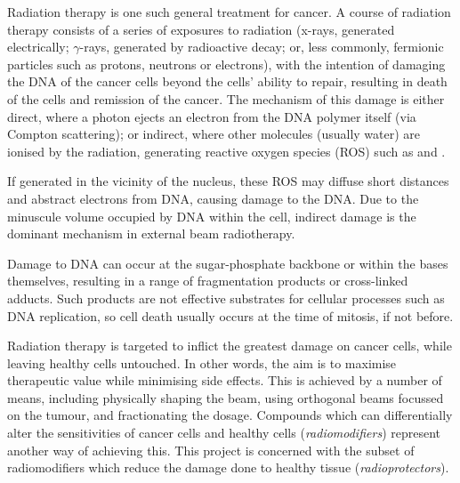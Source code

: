 \begin{refsection}
Radiation therapy is one such general treatment for cancer.
A course of radiation therapy consists of a series of exposures to radiation (x-rays, generated electrically; $\gamma$-rays, generated by radioactive decay; or, less commonly, fermionic particles such as protons, neutrons or electrons), with the intention of damaging the DNA of the cancer cells beyond the cells' ability to repair, resulting in death of the cells and remission of the cancer\autocite{Ward1994}.
The mechanism of this damage is either direct, where a photon ejects an electron from the DNA polymer itself (via Compton scattering); or indirect, where other molecules (usually water) are ionised by the radiation, generating reactive oxygen species (ROS) such as  and \autocite{Ward1988}.

If generated in the vicinity of the nucleus, these ROS may diffuse short distances and abstract electrons from DNA, causing damage to the DNA\autocite{Evans2004}.
Due to the minuscule volume occupied by DNA within the cell, indirect damage is the dominant mechanism in external beam radiotherapy\autocite{Ward1988}.

Damage to DNA can occur at the sugar-phosphate backbone or within the bases themselves, resulting in a range of fragmentation products or cross-linked adducts\autocite{Evans2004}.
Such products are not effective substrates for cellular processes such as DNA replication, so cell death usually occurs at the time of mitosis, if not before\autocite{Withers1992}.

Radiation therapy is targeted to inflict the greatest damage on cancer cells, while leaving healthy cells untouched.
In other words, the aim is to maximise therapeutic value while minimising side effects.
This is achieved by a number of means, including physically shaping the beam, using orthogonal beams focussed on the tumour, and fractionating the dosage.
Compounds which can differentially alter the sensitivities of cancer cells and healthy cells (\emph{radiomodifiers}) represent another way of achieving this.
This project is concerned with the subset of radiomodifiers which reduce the damage done to healthy tissue (\emph{radioprotectors}).



\end{refsection}
